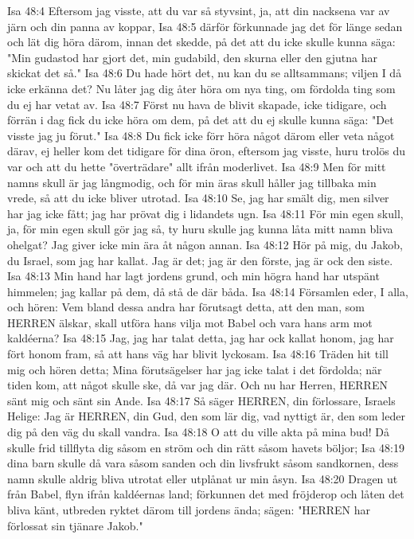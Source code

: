 Isa 48:4  Eftersom jag visste, att du var så styvsint, ja, att din nacksena var av järn och din panna av koppar,
Isa 48:5  därför förkunnade jag det för länge sedan och lät dig höra därom, innan det skedde, på det att du icke skulle kunna säga: "Min gudastod har gjort det, min gudabild, den skurna eller den gjutna har skickat det så."
Isa 48:6  Du hade hört det, nu kan du se alltsammans; viljen I då icke erkänna det? Nu låter jag dig åter höra om nya ting, om fördolda ting som du ej har vetat av.
Isa 48:7  Först nu hava de blivit skapade, icke tidigare, och förrän i dag fick du icke höra om dem, på det att du ej skulle kunna säga: "Det visste jag ju förut."
Isa 48:8  Du fick icke förr höra något därom eller veta något därav, ej heller kom det tidigare för dina öron, eftersom jag visste, huru trolös du var och att du hette "överträdare" allt ifrån moderlivet.
Isa 48:9  Men för mitt namns skull är jag långmodig, och för min äras skull håller jag tillbaka min vrede, så att du icke bliver utrotad.
Isa 48:10  Se, jag har smält dig, men silver har jag icke fått; jag har prövat dig i lidandets ugn.
Isa 48:11  För min egen skull, ja, för min egen skull gör jag så, ty huru skulle jag kunna låta mitt namn bliva ohelgat? Jag giver icke min ära åt någon annan.
Isa 48:12  Hör på mig, du Jakob, du Israel, som jag har kallat. Jag är det; jag är den förste, jag är ock den siste.
Isa 48:13  Min hand har lagt jordens grund, och min högra hand har utspänt himmelen; jag kallar på dem, då stå de där båda.
Isa 48:14  Församlen eder, I alla, och hören: Vem bland dessa andra har förutsagt detta, att den man, som HERREN älskar, skall utföra hans vilja mot Babel och vara hans arm mot kaldéerna?
Isa 48:15  Jag, jag har talat detta, jag har ock kallat honom, jag har fört honom fram, så att hans väg har blivit lyckosam.
Isa 48:16  Träden hit till mig och hören detta; Mina förutsägelser har jag icke talat i det fördolda; när tiden kom, att något skulle ske, då var jag där. Och nu har Herren, HERREN sänt mig och sänt sin Ande.
Isa 48:17  Så säger HERREN, din förlossare, Israels Helige: Jag är HERREN, din Gud, den som lär dig, vad nyttigt är, den som leder dig på den väg du skall vandra.
Isa 48:18  O att du ville akta på mina bud! Då skulle frid tillflyta dig såsom en ström och din rätt såsom havets böljor;
Isa 48:19  dina barn skulle då vara såsom sanden och din livsfrukt såsom sandkornen, dess namn skulle aldrig bliva utrotat eller utplånat ur min åsyn.
Isa 48:20  Dragen ut från Babel, flyn ifrån kaldéernas land; förkunnen det med fröjderop och låten det bliva känt, utbreden ryktet därom till jordens ända; sägen: "HERREN har förlossat sin tjänare Jakob."

